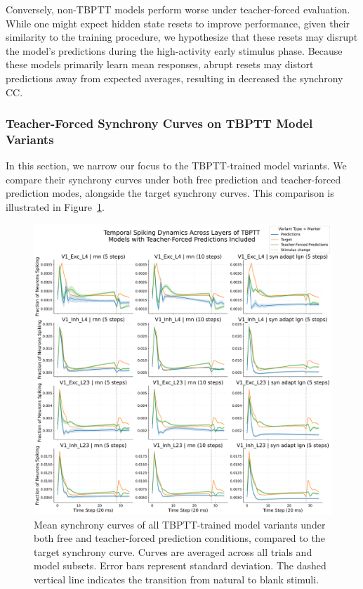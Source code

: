 Conversely, non-TBPTT models perform worse under teacher-forced evaluation. While one might expect hidden state resets to improve performance, given their similarity to the training procedure, we hypothesize that these resets may disrupt the model's predictions during the high-activity early stimulus phase. Because these models primarily learn mean responses, abrupt resets may distort predictions away from expected averages, resulting in decreased the synchrony CC.


\subsubsection{Teacher-Forced Synchrony Curves on TBPTT Model Variants}
\label{subsubsec:teacher_forced_synchrony_curves_tbptt}
In this section, we narrow our focus to the TBPTT-trained model variants. We compare their synchrony curves under both free prediction and teacher-forced prediction modes, alongside the target synchrony curves. This comparison is illustrated in Figure~\ref{fig:free_vs_teacher_forced_synchrony}.

\begin{figure}
    \centering
    \includegraphics[width=\linewidth]{img/plots/tbptt_models_forced_included_model_synchrony_curve.pdf}
    \caption{Mean synchrony curves of all TBPTT-trained model variants under both free and teacher-forced prediction conditions, compared to the target synchrony curve. Curves are averaged across all trials and model subsets. Error bars represent standard deviation. The dashed vertical line indicates the transition from natural to blank stimuli.}
    \label{fig:free_vs_teacher_forced_synchrony}
\end{figure}

